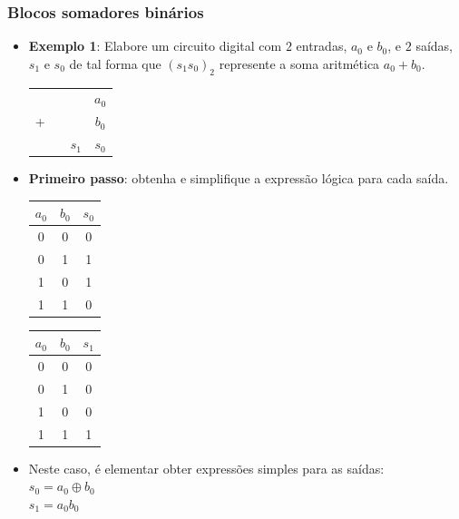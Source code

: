 \documentclass{beamer}
\begin{document}
\begin{frame}
\frametitle{Blocos somadores binários}

\begin{itemize}
\item \textbf{Exemplo 1}: Elabore um circuito digital com $2$ entradas, $a_0$ e $b_0$, e $2$ saídas, $s_1$ e $s_0$ de tal forma que $(s_1 s_0)_2$ represente a soma aritmética $a_0 + b_0$.
\vspace{-12pt}
\begin{center}
\begin{tabular}{cc@{}c@{\,}c}
  && & $a_0$ \\
+ && & $b_0$ \\
\cline{2-4}
  && $s_1$ & $s_0$
\end{tabular}
\end{center}

\pause

\item \textbf{Primeiro passo}: obtenha e simplifique a expressão lógica
para cada saída.

\pause

\begin{center}
\begin{tabular}{cc||c}
$a_0$ & $b_0$ & $s_0$ \\
\hline
  0   &   0   &   0   \\
  0   &   1   &   1   \\
  1   &   0   &   1   \\
  1   &   1   &   0
\end{tabular}
\hspace{6ex}
\begin{tabular}{cc||c}
$a_0$ & $b_0$ & $s_1$ \\
\hline
  0   &   0   &   0   \\
  0   &   1   &   0   \\
  1   &   0   &   0   \\
  1   &   1   &   1
\end{tabular}
\end{center}

\pause

\item Neste caso, é elementar obter expressões simples para as saídas:\\
$s_0 = a_0 \oplus b_0$\\
$s_1 = a_0 b_0$

\end{itemize}


\end{frame}
\end{document}
